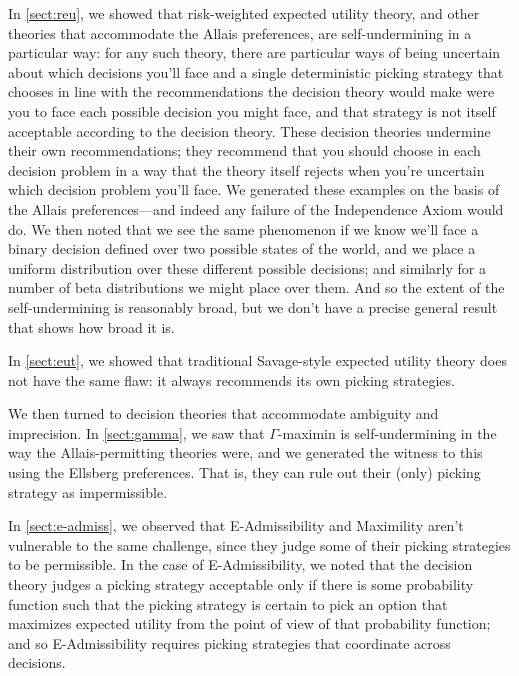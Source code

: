 \documentclass[a4paper]{article}
\renewcommand\P{\mathbb{P}} %
\newcommand\EU{\mathrm{EU}}
\newcommand{\IP}{\P}
\newcommand{\todoold}[2][]{\todo[backgroundcolor=white,bordercolor=orange!10,linecolor=gray!10, #1,caption={},textcolor=gray]{Pre-rev: #2}}
\newenvironment{CCM rewritten}
{\begingroup\color{blue}} %
{\endgroup}              %
\begin{document}
In \cref{sect:reu}, we showed that risk-weighted expected utility theory, and other theories that accommodate the Allais preferences, are self-undermining in a particular way: for any such theory, there are particular ways of being uncertain about which decisions you'll face and a single deterministic picking strategy that chooses in line with the recommendations the decision theory would make were you to face each possible decision you might face, and that strategy is not itself acceptable according to the decision theory. These decision theories undermine their own recommendations; they recommend that you should choose in each decision problem in a way that the theory itself rejects when you're uncertain which decision problem you'll face. We generated these examples on the basis of the Allais preferences---and indeed any failure of the Independence Axiom would do. We then noted that we see the same phenomenon if we know we'll face a binary decision defined over two possible states of the world, and we place a uniform distribution over these different possible decisions; and similarly for a number of beta distributions we might place over them. And so the extent of the self-undermining is reasonably broad, but we don't have a precise general result that shows how broad it is.

In \cref{sect:eut}, we showed that traditional Savage-style expected utility theory does not have the same flaw: it always recommends its own picking strategies.

We then turned to decision theories that accommodate ambiguity and imprecision. In \cref{sect:gamma}, we saw that $\Gamma$-maximin is self-undermining in the way the Allais-permitting theories were, and we generated the witness to this using the Ellsberg preferences.\todoold{are we going to say something about} That is, they can rule out their (only) picking strategy as impermissible. 

In \cref{sect:e-admiss}, we observed that E-Admissibility and Maximility aren't vulnerable to the same challenge, since they judge some of their picking strategies to be permissible. In the case of E-Admissibility, we noted that the decision theory judges a picking strategy acceptable only if there is some probability function such that the picking strategy is certain to pick an option that maximizes expected utility from the point of view of that probability function; and so E-Admissibility requires picking strategies that coordinate across decisions.

\end{document}

